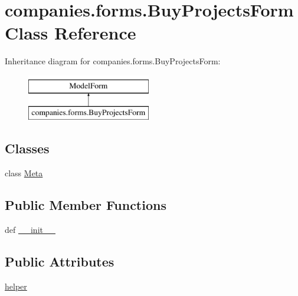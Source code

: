 \hypertarget{classcompanies_1_1forms_1_1_buy_projects_form}{\section{companies.\-forms.\-Buy\-Projects\-Form Class Reference}
\label{classcompanies_1_1forms_1_1_buy_projects_form}
}
Inheritance diagram for companies.\-forms.\-Buy\-Projects\-Form\-:\begin{figure}[H]
\begin{center}
\leavevmode
\includegraphics[height=2.000000cm]{classcompanies_1_1forms_1_1_buy_projects_form}
\end{center}
\end{figure}
\subsection*{Classes}
\begin{DoxyCompactItemize}
\item 
class \hyperlink{classcompanies_1_1forms_1_1_buy_projects_form_1_1_meta}{Meta}
\end{DoxyCompactItemize}
\subsection*{Public Member Functions}
\begin{DoxyCompactItemize}
\item 
def \hyperlink{classcompanies_1_1forms_1_1_buy_projects_form_a7c39b8107734a754304eae35c9ce8066}{\-\_\-\-\_\-init\-\_\-\-\_\-}
\end{DoxyCompactItemize}
\subsection*{Public Attributes}
\begin{DoxyCompactItemize}
\item 
\hyperlink{classcompanies_1_1forms_1_1_buy_projects_form_af53e7c335f9707af8580dd299c902c91}{helper}
\end{DoxyCompactItemize}


